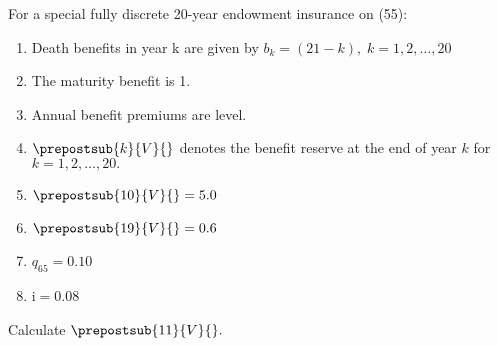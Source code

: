 For a special fully discrete 20-year endowment insurance on (55):
\begin{enumerate}
  \item Death benefits in year k are given by $b_k = (21- k), \; k = 1, 2, \ldots, 20$
  \item The maturity benefit is 1.
  \item Annual benefit premiums are level.
  \item $\prepostsub{k}{V}{}$ denotes the benefit reserve at the end of year $k$ for $k = 1, 2,\ldots, 20.$
  \item $\prepostsub{10}{V}{} = 5.0$
  \item $\prepostsub{19}{V}{} = 0.6$
  \item $q_{65} = 0.10$
  \item i$ = 0.08$
\end{enumerate}
Calculate $\prepostsub{11}{V}{}.$
